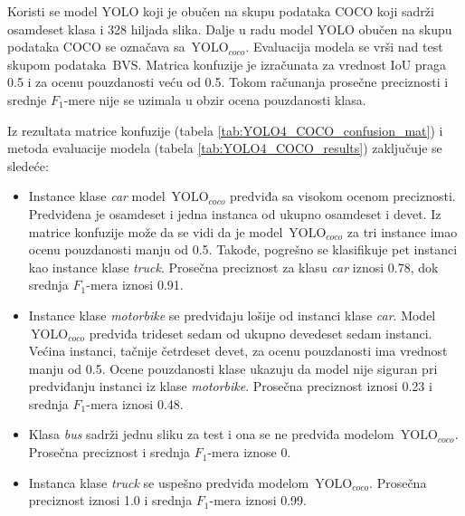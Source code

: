 \documentclass[12pt,oneside]{memoir}
\newcommand{\yolo}{\ensuremath{\,\textrm{YOLO}}}
\newcommand{\bvs}{\ensuremath{\,\textrm{BVS}}}
\begin{document}
Koristi se model YOLO koji je obučen na skupu podataka COCO koji sadrži osamdeset klasa i 328 hiljada slika. Dalje u radu model YOLO obučen na skupu podataka COCO se označava sa $\yolo_{coco}$. Evaluacija modela se vrši nad test skupom podataka \bvs. Matrica konfuzije je izračunata za vrednost IoU praga 0.5 i za ocenu pouzdanosti veću od 0.5. Tokom računanja prosečne preciznosti i srednje $F_1$-mere nije se uzimala u obzir ocena pouzdanosti klasa. 

Iz rezultata matrice konfuzije (tabela \ref{tab:YOLO4_COCO_confusion_mat}) i metoda evaluacije modela (tabela \ref{tab:YOLO4_COCO_results}) zaključuje se sledeće:
\begin{itemize}
    \item Instance klase \textit{car} model $\yolo_{coco}$ predviđa sa visokom ocenom preciznosti. Predviđena je osamdeset i jedna instanca od ukupno osamdeset i devet. Iz matrice konfuzije može da se vidi da je model $\yolo_{coco}$ za tri instance imao ocenu pouzdanosti manju od 0.5. Takođe, pogrešno se klasifikuje pet instanci kao instance klase \textit{truck}. Prosečna preciznost za klasu \textit{car} iznosi 0.78, dok srednja $F_1$-mera iznosi 0.91.
    \item Instance klase \textit{motorbike} se predviđaju lošije od instanci klase \textit{car}. Model $\yolo_{coco}$ predviđa trideset sedam od ukupno devedeset sedam instanci. Većina instanci, tačnije četrdeset devet, za ocenu pouzdanosti ima vrednost manju od 0.5. Ocene pouzdanosti klase ukazuju da model nije siguran pri predviđanju instanci iz klase \textit{motorbike}. Prosečna preciznost iznosi 0.23 i srednja $F_1$-mera iznosi 0.48.
    \item Klasa \textit{bus} sadrži jednu sliku za test i ona se ne predviđa modelom $\yolo_{coco}$. Prosečna preciznost i srednja $F_1$-mera iznose 0.
    \item Instanca klase \textit{truck} se uspešno predviđa modelom $\yolo_{coco}$. Prosečna preciznost iznosi 1.0 i srednja $F_1$-mera iznosi 0.99.
\end{itemize}
\end{document}
